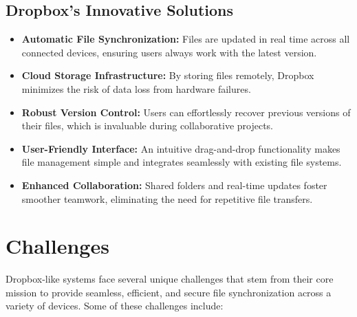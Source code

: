 \subsection{Dropbox's Innovative Solutions}
\begin{itemize}
    \item \textbf{Automatic File Synchronization:} Files are updated in real time across all connected devices, ensuring users always work with the latest version.
    \item \textbf{Cloud Storage Infrastructure:} By storing files remotely, Dropbox minimizes the risk of data loss from hardware failures.
    \item \textbf{Robust Version Control:} Users can effortlessly recover previous versions of their files, which is invaluable during collaborative projects.
    \item \textbf{User-Friendly Interface:} An intuitive drag-and-drop functionality makes file management simple and integrates seamlessly with existing file systems.
    \item \textbf{Enhanced Collaboration:} Shared folders and real-time updates foster smoother teamwork, eliminating the need for repetitive file transfers.
\end{itemize}


\section{Challenges}
Dropbox-like systems face several unique challenges that stem from their core mission to provide seamless, efficient, and secure file synchronization across a variety of devices. Some of these challenges include:

